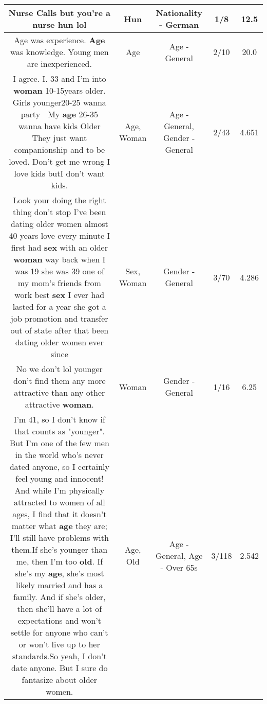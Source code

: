 \documentclass[11pt]{article}
\newlength\mylength
\begin{document}
\begin{center}
\begin{longtable}{|C{.65\mylength}|C{.30\mylength}|C{.12\mylength}|C{.12\mylength}|C{.12\mylength}|}
  \small Nurse Calls but you're a nurse \textbf{hun} lol\normalsize   & Hun & Nationality - German & 1/8 & 12.5 \\  \hline
  \small Age was experience.   \textbf{Age} was knowledge. Young men are inexperienced.\normalsize   & Age & Age - General & 2/10 & 20.0 \\  \hline
  \small I agree. I.   33 and I'm into \textbf{woman} 10-15years older.  Girls younger20-25 wanna party 🎉 My \textbf{age} 26-35 wanna have kids Older They just want companionship and to be loved. Don't get me wrong  I love kids butI don't want kids.\normalsize   & Age, Woman & Age - General, Gender - General & 2/43 & 4.651 \\  \hline
  \small Look your doing the right thing don't stop I've been dating older women almost 40 years love every minute I first had \textbf{sex} with an older \textbf{woman} way back when I was 19 she was 39 one of my mom's friends from work best \textbf{sex} I ever had lasted for a year she got a job promotion and transfer out of state after that been dating older women ever since\normalsize   & Sex, Woman & Gender - General & 3/70 & 4.286 \\  \hline
  \small No we don't lol  younger don't find them any more attractive than any other attractive \textbf{woman}.\normalsize   & Woman & Gender - General & 1/16 & 6.25 \\  \hline
  \small I'm 41, so I don't know if that counts as "younger". But I'm one of the few men in the world who's never dated anyone, so I certainly feel young and innocent! And while I'm physically attracted to women of all ages, I find that it doesn't matter what \textbf{age} they are; I'll still have problems with them.If she's younger than me, then I'm too \textbf{old}. If she's my \textbf{age}, she's most likely married and has a family. And if she's older, then she'll have a lot of expectations and won't settle for anyone who can't or won't live up to her standards.So yeah, I don't date anyone. But I sure do fantasize about older women.\normalsize   & Age, Old & Age - General, Age - Over 65s & 3/118 & 2.542 \\  \hline

\end{longtable}
\end{center}
\end{document}
